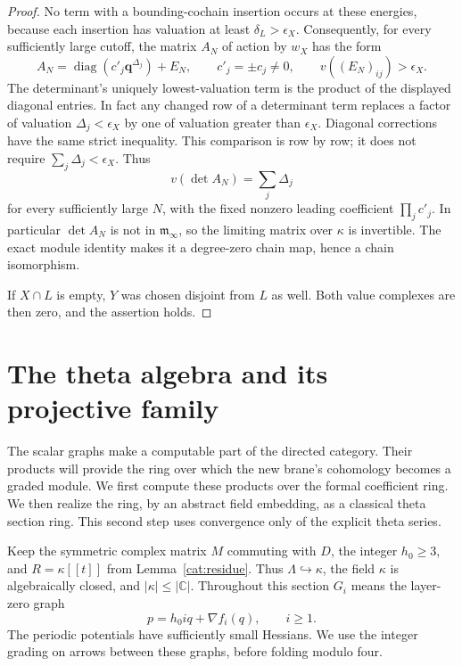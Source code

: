 \documentclass[11pt]{article}
\theoremstyle{definition}
\theoremstyle{remark}
\numberwithin{equation}{section}
\begin{document}
\begin{proof}
No term with a bounding-cochain insertion occurs at these energies,
because each insertion has valuation at least
\(\delta_L>\epsilon_X\).
Consequently, for every sufficiently large cutoff, the matrix \(A_N\)
of action by \(w_X\) has the form
\[
 A_N=\operatorname{diag}(c'_j\mathbf q^{\Delta_j})+E_N,
 \qquad c'_j=\pm c_j\ne0,\qquad
 v((E_N)_{ij})>\epsilon_X.
\]
The determinant's uniquely lowest-valuation term is the product of the
displayed diagonal entries.  In fact any changed row of a determinant
term replaces a factor of valuation \(\Delta_j<\epsilon_X\) by one of
valuation greater than \(\epsilon_X\).  Diagonal corrections have the
same strict inequality.  This comparison is row by row; it does not
require \(\sum_j\Delta_j<\epsilon_X\).
Thus
\[
 v(\det A_N)=\sum_j\Delta_j
\]
for every sufficiently large \(N\), with the fixed nonzero leading
coefficient \(\prod_j c'_j\).  In particular \(\det A_N\) is not in
\(\mathfrak m_\infty\), so the limiting matrix over \(\kappa\) is
invertible.  The exact module identity makes it a degree-zero chain
map, hence a chain isomorphism.

If \(X\cap L\) is empty, \(Y\) was chosen disjoint from \(L\) as well.
Both value complexes are then zero, and the assertion holds.
\end{proof}

\section{The theta algebra and its projective family}\label{theta:section}

The scalar graphs make a computable part of the directed category.  Their
products will provide the ring over which the new brane's cohomology becomes
a graded module.  We first compute these products over the formal coefficient
ring.  We then realize the ring, by an abstract field embedding, as a classical
theta section ring.  This second step uses convergence only of the explicit
theta series.

Keep the symmetric complex matrix $M$ commuting with $D$, the integer
$h_0\geq3$, and $R=\kappa[[t]]$ from Lemma~\ref{cat:residue}.  Thus
$\Lambda\hookrightarrow\kappa$, the field $\kappa$ is algebraically closed,
and $|\kappa|\leq|\mathbb C|$.  Throughout this section $G_i$ means the layer-zero
graph
\[
 p=h_0i q+\nabla f_i(q),\qquad i\geq1.
\]
The periodic potentials have sufficiently small Hessians.  We use the
integer grading on arrows between these graphs, before folding modulo four.
\end{document}
